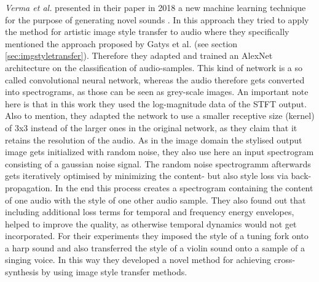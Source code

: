 \textit{Verma et al.} presented in their paper in 2018 a new machine learning technique for the purpose of generating novel sounds \cite{verma2018neural}. In this approach they tried to apply the method for artistic image style transfer to audio where they specifically mentioned the approach proposed by Gatys et al.\cite{Gatys2016} (see section \ref{sec:imgstyletransfer}). Therefore they adapted and trained an AlexNet architecture on the classification of audio-samples. This kind of network is a so called convolutional neural network, whereas the audio therefore gets converted into spectrograms, as those can be seen as grey-scale images. An important note here is that in this work they used the log-magnitude data of the STFT output. Also to mention, they adapted the network to use a smaller receptive size (kernel) of 3x3 instead of the larger ones in the original network, as they claim that it retains the resolution of the audio. As in the image domain the stylised output image gets initialized with random noise, they also use here an input spectrogram consisting of a gaussian noise signal. The random noise spectrogramm afterwards gets iteratively optimised by minimizing the content- but also style loss via back-propagation. In the end this process creates a spectrogram containing the content of one audio with the style of one other audio sample. They also found out that including additional loss terms for temporal and frequency energy envelopes, helped to improve the quality, as otherwise temporal dynamics would not get incorporated. For their experiments they imposed the style of a tuning fork onto a harp sound and also transferred the style of a violin sound onto a sample of a singing voice. In this way they developed a novel method for achieving cross-synthesis by using image style transfer methods.\\


